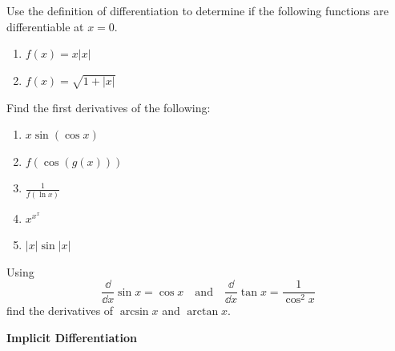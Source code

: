 \begin{Exercise}
  \label{exercise differentiable f = x|x|}
  Use the definition of differentiation to determine if the following 
  functions are differentiable at $x = 0$.
  \begin{enumerate}
  \item
    $f(x) = x |x|$
  \item
    $f(x) = \sqrt{1 + |x|}$
  \end{enumerate}

\end{Exercise}









\begin{Exercise}
  \label{exercise d/dx x sin cos x}
  Find the first derivatives of the following:
  \renewcommand{\theenumi}{\alph{enumi}}
  \begin{enumerate}
  \item
    $x \sin( \cos x)$
  \item
    $f( \cos( g(x) ) )$
  \item
    $\frac{1}{f(\ln x)}$
  \item
    $x^{x^x}$
  \item
    $|x| \sin |x|$
  \end{enumerate}
  \renewcommand{\theenumi}{\arabic{enumi}}

\end{Exercise}



\begin{Exercise}
  \label{exercise d/dx arcsin x}
  Using 
  \[
  \frac{\dd}{\dd x} \sin x = \cos x \quad \mathrm{and} \quad
  \frac{\dd}{\dd x} \tan x = \frac{1}{\cos^2 x}
  \]
  find the derivatives of $\arcsin x$ and $\arctan x$.

\end{Exercise}




\begin{large}
  \noindent
  \textbf{Implicit Differentiation}
\end{large}


